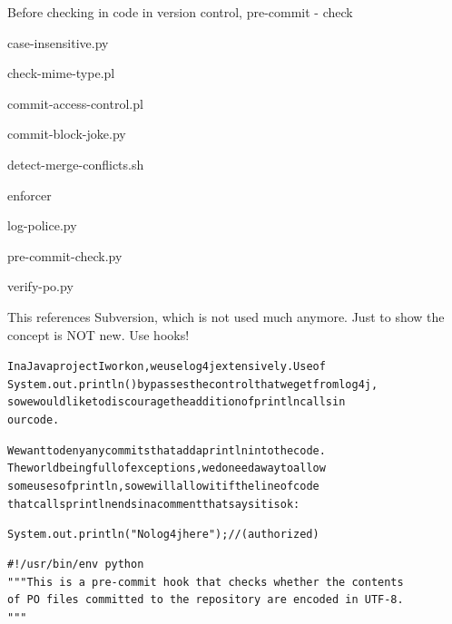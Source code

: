 \documentclass[Screen16to9,17pt]{foils}
\begin{document}
\begin{list1}
\item Before checking in code in version control,  pre-commit - check
\begin{list2}
\item case-insensitive.py
\item check-mime-type.pl
\item commit-access-control.pl
\item commit-block-joke.py
\item detect-merge-conflicts.sh
\item enforcer
\item log-police.py
\item pre-commit-check.py
\item verify-po.py
\end{list2}
\item {}
\item {}
\end{list1}

This references Subversion, which is not used much anymore. Just to show the concept is NOT new. Use hooks!


\begin{alltt}
In a Java project I work on, we use log4j extensively.  Use of
System.out.println() bypasses the control that we get from log4j,
so we would like to discourage the addition of println calls in
our code.

We want to deny any commits that add a println into the code.
The world being full of exceptions, we do need a way to allow
some uses of println, so we will allow it if the line of code
that calls println ends in a comment that says it is ok:

   System.out.println("No log4j here"); // (authorized)
\end{alltt}

{\small {}}




\begin{verbatim}
#!/usr/bin/env python
"""This is a pre-commit hook that checks whether the contents
of PO files committed to the repository are encoded in UTF-8.
"""
\end{verbatim}
\end{document}
